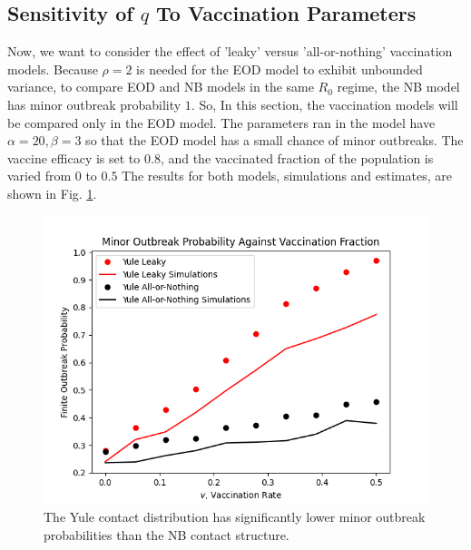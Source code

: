 \documentclass[11pt, twocolumn]{article}
\begin{document}
\subsection*{Sensitivity of $q$ To Vaccination Parameters}
Now, we want to consider the effect of 'leaky' versus 'all-or-nothing' vaccination models. Because $\rho=2$ is needed for the EOD model to exhibit unbounded variance, to compare EOD and NB models in the same $R_0$ regime, the NB model has minor outbreak probability $1$. So, In this section, the vaccination models will be compared only in the EOD model. The parameters ran in the model have $\alpha=20, \beta=3$ so that the EOD model has a small chance of minor outbreaks. The vaccine efficacy is set to $0.8$, and the vaccinated fraction of the population is varied from $0$ to $0.5$ The results for both models, simulations and estimates, are shown in Fig. \ref{fig:vacccomp}.

\begin{figure}
	\centering
	\includegraphics[scale=0.5]{YuleVaccComparison.png}
	\caption{The Yule contact distribution has significantly lower minor outbreak probabilities than the NB contact structure.}
	\label{fig:vacccomp}
\end{figure}
\end{document}

